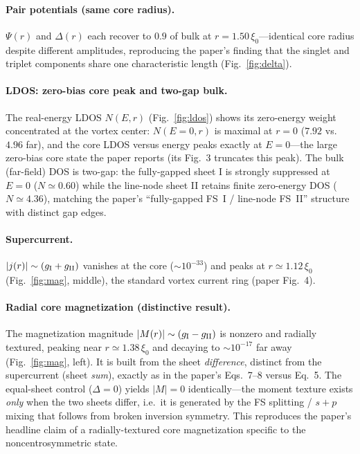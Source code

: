 \documentclass[11pt]{article}
\begin{document}
\paragraph{Pair potentials (same core radius).} $\Psi(r)$ and $\Delta(r)$ each
recover to $0.9$ of bulk at $r=1.50\,\xi_0$---identical core radius despite
different amplitudes, reproducing the paper's finding that the singlet and
triplet components share one characteristic length (Fig.~\ref{fig:delta}).

\paragraph{LDOS: zero-bias core peak and two-gap bulk.} The real-energy LDOS
$N(E,r)$ (Fig.~\ref{fig:ldos}) shows its zero-energy weight concentrated at the
vortex center: $N(E{=}0,r)$ is maximal at $r=0$ ($7.92$ vs.\ $4.96$ far), and
the core LDOS versus energy peaks exactly at $E=0$---the large zero-bias core
state the paper reports (its Fig.~3 truncates this peak). The bulk (far-field)
DOS is two-gap: the fully-gapped sheet I is strongly suppressed at $E=0$
($N\simeq0.60$) while the line-node sheet II retains finite zero-energy DOS
($N\simeq4.36$), matching the paper's ``fully-gapped FS~I / line-node FS~II''
structure with distinct gap edges.

\paragraph{Supercurrent.} $|j(r)|\sim(g_{\rm I}+g_{\rm II})$ vanishes at the
core ($\sim10^{-33}$) and peaks at $r\simeq1.12\,\xi_0$
(Fig.~\ref{fig:mag}, middle), the standard vortex current ring (paper Fig.~4).

\paragraph{Radial core magnetization (distinctive result).} The magnetization
magnitude $|M(r)|\sim(g_{\rm I}-g_{\rm II})$ is nonzero and radially textured,
peaking near $r\simeq1.38\,\xi_0$ and decaying to $\sim10^{-17}$ far away
(Fig.~\ref{fig:mag}, left). It is built from the sheet \emph{difference},
distinct from the supercurrent (sheet \emph{sum}), exactly as in the paper's
Eqs.~7--8 versus Eq.~5. The equal-sheet control ($\Delta=0$) yields $|M|=0$
identically---the moment texture exists \emph{only} when the two sheets differ,
i.e.\ it is generated by the FS splitting / $s+p$ mixing that follows from
broken inversion symmetry. This reproduces the paper's headline claim of a
radially-textured core magnetization specific to the noncentrosymmetric state.
\end{document}
